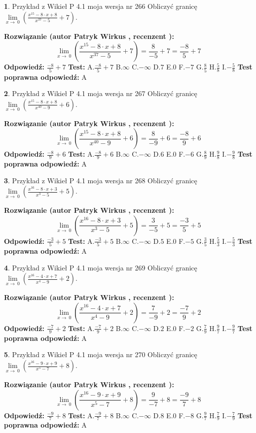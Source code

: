 \documentclass[12pt, a4paper]{article}
\theoremstyle{definition} %
\newtheorem{zad}{}
\newcommand{\zadStart}[1]{\begin{zad}#1\newline}
\newcommand{\zadStop}{\end{zad}}
\newcommand{\rozwStart}[2]{\noindent \textbf{Rozwiązanie (autor #1 , recenzent #2): }\newline}
\newcommand{\rozwStop}{\newline}
\newcommand{\odpStart}{\noindent \textbf{Odpowiedź:}\newline}
\newcommand{\odpStop}{\newline}
\newcommand{\testStart}{\noindent \textbf{Test:}\newline}
\newcommand{\testStop}{\newline}
\newcommand{\kluczStart}{\noindent \textbf{Test poprawna odpowiedź:}\newline}
\newcommand{\kluczStop}{\newline}
\begin{document}
\zadStart{Przykład z Wikieł P 4.1 moja wersja nr 266}
Obliczyć granicę $\lim\limits_{x\to\ 0}(\frac{x^{15}-8 \cdot x +8}{x^{37}-5}+7)$.
\zadStop
\rozwStart{Patryk Wirkus}{}
$$\lim\limits_{x\to\ 0}(\frac{x^{15}-8 \cdot x +8}{x^{37}-5}+7)=\frac{8}{-5}+7=\frac{-8}{5}+7$$
\rozwStop
\odpStart
$\frac{-8}{5}+7$
\odpStop
\testStart
A.$\frac{-8}{5}+7$
B.$\infty$
C.$-\infty$
D.$7$
E.$0$
F.$-7$
G.$\frac{8}{5}$
H.$\frac{5}{8}$
I.$-\frac{5}{8}$
\testStop
\kluczStart
A
\kluczStop



\zadStart{Przykład z Wikieł P 4.1 moja wersja nr 267}
Obliczyć granicę $\lim\limits_{x\to\ 0}(\frac{x^{15}-8 \cdot x +8}{x^{40}-9}+6)$.
\zadStop
\rozwStart{Patryk Wirkus}{}
$$\lim\limits_{x\to\ 0}(\frac{x^{15}-8 \cdot x +8}{x^{40}-9}+6)=\frac{8}{-9}+6=\frac{-8}{9}+6$$
\rozwStop
\odpStart
$\frac{-8}{9}+6$
\odpStop
\testStart
A.$\frac{-8}{9}+6$
B.$\infty$
C.$-\infty$
D.$6$
E.$0$
F.$-6$
G.$\frac{8}{9}$
H.$\frac{9}{8}$
I.$-\frac{9}{8}$
\testStop
\kluczStart
A
\kluczStop



\zadStart{Przykład z Wikieł P 4.1 moja wersja nr 268}
Obliczyć granicę $\lim\limits_{x\to\ 0}(\frac{x^{16}-8 \cdot x +3}{x^{3}-5}+5)$.
\zadStop
\rozwStart{Patryk Wirkus}{}
$$\lim\limits_{x\to\ 0}(\frac{x^{16}-8 \cdot x +3}{x^{3}-5}+5)=\frac{3}{-5}+5=\frac{-3}{5}+5$$
\rozwStop
\odpStart
$\frac{-3}{5}+5$
\odpStop
\testStart
A.$\frac{-3}{5}+5$
B.$\infty$
C.$-\infty$
D.$5$
E.$0$
F.$-5$
G.$\frac{3}{5}$
H.$\frac{5}{3}$
I.$-\frac{5}{3}$
\testStop
\kluczStart
A
\kluczStop



\zadStart{Przykład z Wikieł P 4.1 moja wersja nr 269}
Obliczyć granicę $\lim\limits_{x\to\ 0}(\frac{x^{16}-4 \cdot x +7}{x^{4}-9}+2)$.
\zadStop
\rozwStart{Patryk Wirkus}{}
$$\lim\limits_{x\to\ 0}(\frac{x^{16}-4 \cdot x +7}{x^{4}-9}+2)=\frac{7}{-9}+2=\frac{-7}{9}+2$$
\rozwStop
\odpStart
$\frac{-7}{9}+2$
\odpStop
\testStart
A.$\frac{-7}{9}+2$
B.$\infty$
C.$-\infty$
D.$2$
E.$0$
F.$-2$
G.$\frac{7}{9}$
H.$\frac{9}{7}$
I.$-\frac{9}{7}$
\testStop
\kluczStart
A
\kluczStop



\zadStart{Przykład z Wikieł P 4.1 moja wersja nr 270}
Obliczyć granicę $\lim\limits_{x\to\ 0}(\frac{x^{16}-9 \cdot x +9}{x^{5}-7}+8)$.
\zadStop
\rozwStart{Patryk Wirkus}{}
$$\lim\limits_{x\to\ 0}(\frac{x^{16}-9 \cdot x +9}{x^{5}-7}+8)=\frac{9}{-7}+8=\frac{-9}{7}+8$$
\rozwStop
\odpStart
$\frac{-9}{7}+8$
\odpStop
\testStart
A.$\frac{-9}{7}+8$
B.$\infty$
C.$-\infty$
D.$8$
E.$0$
F.$-8$
G.$\frac{9}{7}$
H.$\frac{7}{9}$
I.$-\frac{7}{9}$
\testStop
\kluczStart
A
\kluczStop
\end{document}
